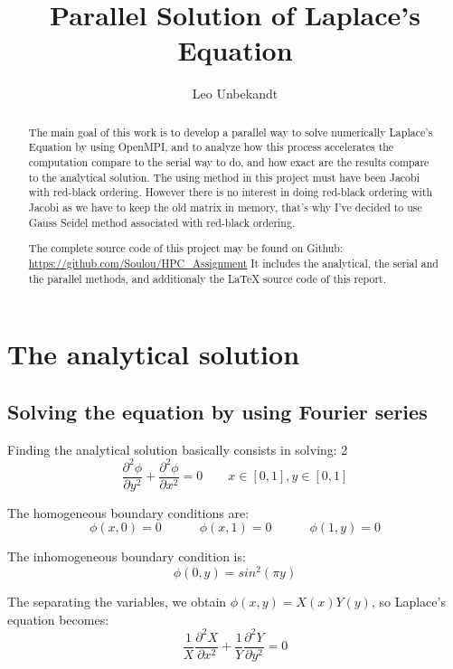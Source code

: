 \documentclass[a4paper,11pt]{article}
\title{Parallel Solution of Laplace's Equation}
\author{Leo Unbekandt}
\begin{document}
\maketitle
\tableofcontents

\begin{abstract}
  The main goal of this work is to develop a parallel way to solve numerically Laplace's Equation by using OpenMPI,
  and to analyze how this process accelerates the computation compare to the serial way to do, and how exact are the
  results compare to the analytical solution. The using method in this project must have been Jacobi with red-black
  ordering. However there is no interest in doing red-black ordering with Jacobi as we have to keep the old matrix in
  memory, that's why I've decided to use Gauss Seidel method associated with red-black ordering.
  
  The complete source code of this project may be found on Github: \url{https://github.com/Soulou/HPC_Assignment}
  It includes the analytical, the serial and the parallel methods, and additionaly the \LaTeX \hspace{5pt} source code of this
  report.
\end{abstract}

\section{The analytical solution}
\subsection{Solving the equation by using Fourier series}

Finding the analytical solution basically consists in solving:
2$$\frac{\partial^2 \phi}{\partial y^2} + \frac{\partial^2 \phi}{\partial x^2} = 0 \hspace{2em} x \in [0,1], y \in [0,1]$$

\noindent The homogeneous boundary conditions are:
$$\phi(x,0) = 0 \hspace{3em} \phi(x,1) = 0 \hspace{3em} \phi(1,y) = 0$$

\noindent The inhomogeneous boundary condition is:
$$\phi(0,y) = sin^2(\pi y)$$

\noindent The separating the variables, we obtain $\phi(x,y) = X(x)Y(y)$, so Laplace's equation becomes:
$$\frac{1}{X}\frac{\partial^2 X}{\partial x^2} + \frac{1}{Y}\frac{\partial^2 Y}{\partial y^2} = 0$$
\end{document}

